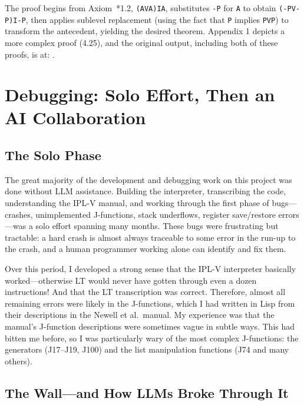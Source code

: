\documentclass[journal]{IEEEtran}
\begin{document}
The proof begins from Axiom~*1.2, \texttt{(AVA)IA}, substitutes
\texttt{-P} for \texttt{A} to obtain \texttt{(-PV-P)I-P}, then applies
sublevel replacement (using the fact that \texttt{P} implies
\texttt{PVP}) to transform the antecedent, yielding the desired
theorem. Appendix 1 depicts a more complex proof (4.25), and the
original output, including both of these proofs, is at: \cite{runoutput}.

\section{Debugging: Solo Effort, Then an AI Collaboration}
\label{sec:debugging}

\subsection{The Solo Phase}

The great majority of the development and debugging work on this
project was done without LLM assistance. Building the interpreter,
transcribing the code, understanding the IPL-V manual, and working
through the first phase of bugs---crashes, unimplemented J-functions,
stack underflows, register save/restore errors---was a solo effort
spanning many months. These bugs were frustrating but tractable: a hard
crash is almost always traceable to some error in the run-up to the
crash, and a human programmer working alone can identify and fix them.

Over this period, I developed a strong sense that the IPL-V
interpreter basically worked---otherwise LT would never have gotten
through even a dozen instructions! And that the LT transcription was
correct. Therefore, almost all remaining errors were likely in the
J-functions, which I had written in Lisp from their descriptions in
the Newell et al.\ manual. My experience was that the manual's
J-function descriptions were sometimes vague in subtle ways. This had
bitten me before, so I was particularly wary of the most complex
J-functions: the generators (J17--J19, J100) and the list manipulation
functions (J74 and many others).

\subsection{The Wall---and How LLMs Broke Through It}
\end{document}
